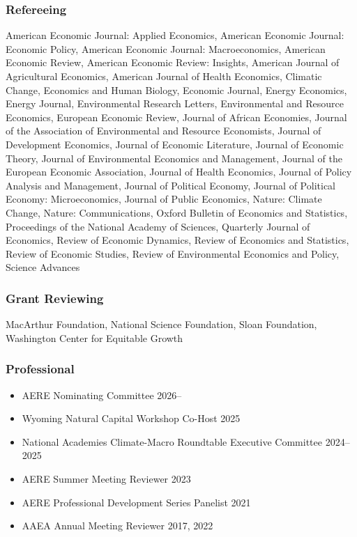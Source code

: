 \documentclass[11pt]{res} %
\begin{document}
\begin{resume}
\subsubsection{Refereeing}\vspace{-.2in}
	American Economic Journal: Applied Economics,
	American Economic Journal: Economic Policy,
	American Economic Journal: Macroeconomics,
	American Economic Review,
	American Economic Review: Insights,
	American Journal of Agricultural Economics,
	American Journal of Health Economics,
	Climatic Change,
	Economics and Human Biology,
	Economic Journal,
	Energy Economics,
	Energy Journal,
	Environmental Research Letters,
	Environmental and Resource Economics,
	European Economic Review,
	Journal of African Economies,
	Journal of the Association of Environmental and Resource Economists,
	Journal of Development Economics,
	Journal of Economic Literature,
	Journal of Economic Theory,
	Journal of Environmental Economics and Management,
	Journal of the European Economic Association,
	Journal of Health Economics,
	Journal of Policy Analysis and Management,
	Journal of Political Economy,
	Journal of Political Economy: Microeconomics,
	Journal of Public Economics,
	Nature: Climate Change,
	Nature: Communications,
	Oxford Bulletin of Economics and Statistics,
	Proceedings of the National Academy of Sciences,
	Quarterly Journal of Economics,
	Review of Economic Dynamics,
	Review of Economics and Statistics,
	Review of Economic Studies,
	Review of Environmental Economics and Policy,
	Science Advances

\vspace{-.2in}

\subsubsection{Grant Reviewing} 

\vspace{-.2in}

MacArthur Foundation, National Science Foundation, Sloan Foundation, Washington Center for Equitable Growth

\vspace{-.2in}


\subsubsection{Professional}
\begin{itemize} \itemsep -1pt
	\item[] AERE Nominating Committee \hfill 2026--
	\item[] Wyoming Natural Capital Workshop Co-Host \hfill 2025
	\item[] National Academies Climate-Macro Roundtable Executive Committee  \hfill 2024--2025
	\item[] AERE Summer Meeting Reviewer \hfill 2023
	\item[]	AERE Professional Development Series Panelist \hfill 2021
	\item[] AAEA Annual Meeting Reviewer \hfill 2017, 2022
\end{itemize}



\end{resume}
\end{document}
